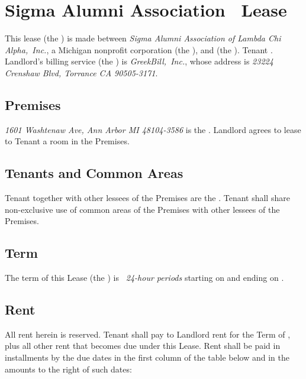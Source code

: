 \documentclass{article}
\begin{document}
\section*{Sigma Alumni Association \leaseDescription\ Lease}

This lease (the ) is made between
\emph{Sigma Alumni Association of Lambda Chi Alpha,~Inc.}, a Michigan nonprofit
corporation (the ), and
\emph{\tenantName} (the ). Tenant%
%
%
%
. Landlord’s billing service (the ) is
\emph{GreekBill,~Inc.}, whose address is \emph{23224 Crenshaw Blvd, Torrance CA
90505-3171}.

\subsection{Premises}
\emph{1601 Washtenaw Ave, Ann Arbor MI 48104-3586} is the
. Landlord agrees to lease to Tenant a room in
the Premises.
%

\subsection{Tenants and Common Areas}
Tenant together with other lessees of the Premises are the
. Tenant shall share non-exclusive use of common
areas of the Premises with other lessees of the Premises.

\subsection{Term}
The term of this Lease (the ) is
\emph{\the\termDuration\ 24-hour periods} starting on
\emph{} and ending on
\emph{}.

\subsection{Rent}
All rent herein is reserved. Tenant shall pay to Landlord rent for the Term of
\emph{\rentTotal}, plus all other rent that becomes due under this Lease. Rent
shall be paid in installments by the due dates in the first column of the table
below and in the amounts to the right of such dates:
\end{document}
